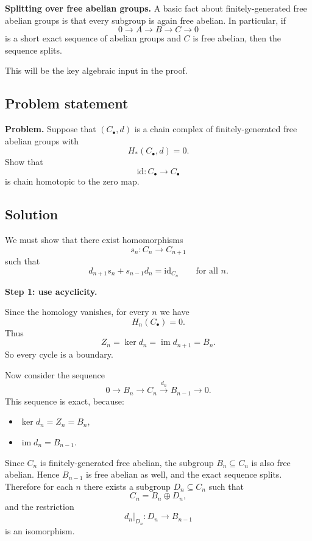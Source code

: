 \documentclass[12pt,a4paper]{article}
\theoremstyle{notespace}
\begin{document}
\medskip

\textbf{Splitting over free abelian groups.}
A basic fact about finitely-generated free abelian groups is that every subgroup is again free abelian. In particular, if
\[
0\to A\to B\to C\to 0
\]
is a short exact sequence of abelian groups and \(C\) is free abelian, then the sequence splits.

This will be the key algebraic input in the proof.

\subsection{Problem statement}

\textbf{Problem.}
Suppose that \((C_\bullet,d)\) is a chain complex of finitely-generated free abelian groups with
\[
H_*(C_\bullet,d)=0.
\]
Show that
\[
\mathrm{id}:C_\bullet\to C_\bullet
\]
is chain homotopic to the zero map.

\subsection{Solution}

We must show that there exist homomorphisms
\[
s_n:C_n\to C_{n+1}
\]
such that
\[
d_{n+1}s_n+s_{n-1}d_n=\mathrm{id}_{C_n}
\qquad\text{for all }n.
\]

\medskip

\textbf{Step 1: use acyclicity.}

Since the homology vanishes, for every \(n\) we have
\[
H_n(C_\bullet)=0.
\]
Thus
\[
Z_n=\ker d_n = \operatorname{im} d_{n+1}=B_n.
\]
So every cycle is a boundary.

Now consider the sequence
\[
0\longrightarrow B_n \longrightarrow C_n \xrightarrow{d_n} B_{n-1}\longrightarrow 0.
\]
This sequence is exact, because:
\begin{itemize}
	\item \(\ker d_n=Z_n=B_n\),
	\item \(\operatorname{im} d_n=B_{n-1}\).
\end{itemize}

Since \(C_n\) is finitely-generated free abelian, the subgroup \(B_n\subseteq C_n\) is also free abelian. Hence \(B_{n-1}\) is free abelian as well, and the exact sequence splits. Therefore for each \(n\) there exists a subgroup \(D_n\subseteq C_n\) such that
\[
C_n=B_n\oplus D_n,
\]
and the restriction
\[
d_n|_{D_n}:D_n\to B_{n-1}
\]
is an isomorphism.

\medskip
\end{document}
